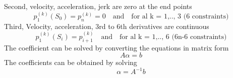 \documentclass[conference,onecolumn,10pt]{IEEEtran}
\begin{document}
Second, velocity, acceleration, jerk are zero at the end points \\
\begin{equation}
p_1^{(k)}(S_{0}) = p_n^{(k)} = 0 \quad \text{and} \quad \text{for al k = 1,.., 3 (6 constraints)}
\end{equation}
Third, Velocity, acceleration, 3rd to 6th derivatives  are continuous
\begin{equation}
p_1^{(k)}(S_{i}) = p_{i+1}^{(k)} \quad \text{and} \quad \text{for al k = 1,.., 6 (6n-6 constraints)}
\end{equation}
The coefficient can be solved by converting the equations in matrix form 
\begin{equation}
A\alpha = b 
\end{equation}
The coefficients can be obtained by solving 
\begin{equation}
\alpha = A^{-1}b
\end{equation}
\end{document}
